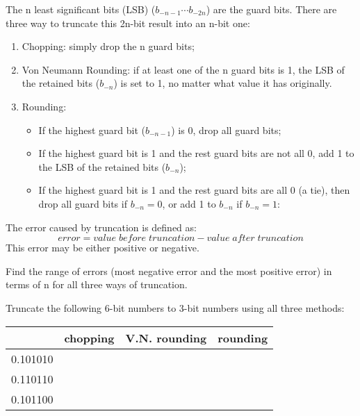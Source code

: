         The n least significant bits (LSB) ($b_{-n-1} \cdots b_{-2n}$) are the guard
        bits. There are three way to truncate this 2n-bit result into an n-bit one:
        \begin{enumerate}
        \item Chopping: simply drop the n guard bits;
        \item Von Neumann Rounding: if at least one of the n guard bits is
                1, the LSB of the retained bits ($b_{-n}$) is set to 1, no 
                matter  what value it has originally.
        \item Rounding: 
                \begin{itemize}
                \item If the highest guard bit ($b_{-n-1}$) is 0, drop all 
                        guard bits;
                \item If the highest guard bit is 1 and the rest guard bits 
                        are not all 0, add 1 to the LSB of the retained bits 
                        ($b_{-n}$);
                \item If the highest guard bit is 1 and the rest guard bits
                        are all 0 (a tie), then drop all guard bits if 
                        $b_{-n}=0$, or add 1 to $b_{-n}$ if $b_{-n}=1$:
                \end{itemize}

        \end{enumerate}
        The error caused by truncation is defined as: 
        \[ error = value\;before\;truncation-value\;after\;truncation   \]
        This error may be either positive or negative. 

        Find the range of errors (most negative error and the most positive
        error) in terms of n for all three ways of truncation.

        Truncate the following 6-bit numbers to 3-bit numbers using all 
        three methods: 
        \vskip 0.2in
        \begin{tabular}{c|c|c|c} \hline
                        & chopping      & V.N. rounding & rounding \\ \hline
         0.101010       &               &               &          \\
         0.110110       &               &               &          \\
         0.101100       &               &               &          \\ \hline
        \end{tabular}
        \vskip 0.2in
                


